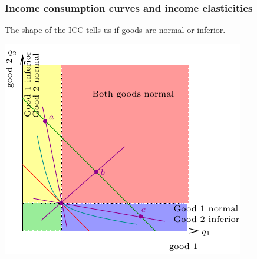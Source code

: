 \documentclass[xcolor=pdftex,dvipsnames]{beamer}
\begin{document}
\begin{frame}\frametitle{Income consumption curves and income
    elasticities}
The shape of the ICC tells us if goods are normal or inferior.
\begin{center}\includegraphics{pics/InfNormal}
\end{center}
\end{frame}
\end{document}
